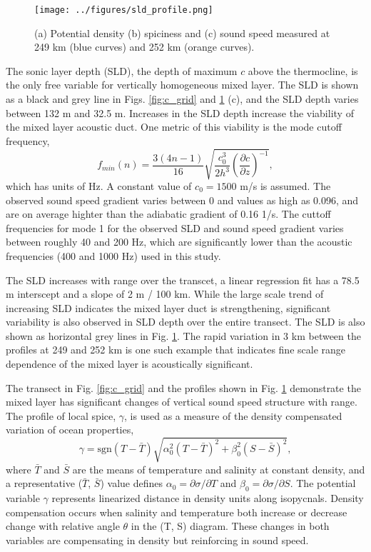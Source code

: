 \documentclass[preprint,NumberedRefs]{JASA}
\begin{document}
\begin{figure}
\texttt{[image: ../figures/sld\_profile.png]}
    \caption{\label{fig:profiles}{(a) Potential density (b) spiciness and (c) sound speed measured at 249 km (blue curves) and 252 km (orange curves).}}
\end{figure}

The sonic layer depth (SLD), the depth of maximum $c$ above the thermocline, is the only free variable for vertically homogeneous mixed layer. The SLD is shown as a black and grey line in Figs. \ref{fig:c_grid} and \ref{fig:profiles} (c), and the SLD depth varies between 132 m and 32.5 m. Increases in the SLD depth increase the viability of the mixed layer acoustic duct. One metric of this viability is the mode cutoff frequency,
\begin{equation}
    f_{min}(n) = \frac{3(4n-1)}{16} \sqrt{\frac{c_0^3}{2h^3} \left( \frac{\partial c}{\partial z} \right) ^ {-1}},
    \label{eq:f_cutoff}
\end{equation}
which has units of Hz. A constant value of $c_0 = 1500$ m/s is assumed. The observed sound speed gradient varies between 0 and values as high as 0.096, and are on average highter than the adiabatic gradient of 0.16 1/s\cite{colosi2020observations}. The cuttoff frequencies for mode 1 for the observed SLD and sound speed gradient varies between roughly 40 and 200 Hz, which are significantly lower than the acoustic frequencies (400 and 1000 Hz) used in this study.

The SLD increases with range over the transcet, a linear regression fit has a 78.5 m interscept and a slope of 2 m / 100 km. While the large scale trend of increasing SLD indicates the mixed layer duct is strengthening, significant variability is also observed in SLD depth over the entire transect. The SLD is also shown as horizontal grey lines in Fig. \ref{fig:profiles}. The rapid variation in 3 km between the profiles at 249 and 252 km is one such example that indicates fine scale range dependence of the mixed layer is acoustically significant.

The transect in Fig. \ref{fig:c_grid} and the profiles shown in Fig. \ref{fig:profiles} demonstrate the mixed layer has significant changes of vertical sound speed structure with range. The profile of local spice, $\gamma$, is used as a measure of the density compensated variation \citep{klymak2015spice} of ocean properties,
\begin{equation}
    \gamma=\textrm{sgn}(T-\bar{T}) \sqrt{\alpha_0^2(T-\bar{T})^2 +\beta_0^2(S-\bar{S})^2},
    \label{eq:gamma}
\end{equation}
where $\bar{T}$ and $\bar{S}$ are the means of temperature and salinity at constant density, and a representative ($\bar{T}$, $\bar{S}$) value defines $\alpha_0=\partial \sigma / \partial T$ and $\beta_0=\partial \sigma / \partial S$. The potential variable $\gamma$ represents linearized distance in density units along isopycnals. Density compensation occurs when salinity and temperature both increase or decrease change with relative angle $\theta$ in the (T, S) diagram. These changes in both variables are compensating in density but reinforcing in sound speed.
\end{document}
